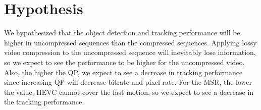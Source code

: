 \section{Hypothesis}
\label{sec:background/section_e}

We hypothesized that the object detection and tracking performance will be higher in uncompressed sequences than the compressed sequences. Applying lossy video compression to the uncompressed sequence will inevitably lose information, so we expect to see the performance to be higher for the uncompressed video. Also, the higher the QP, we expect to see a decrease in tracking performance since increasing QP will decrease bitrate and pixel rate. For the MSR, the lower the value, HEVC cannot cover the fast motion, so we expect to see a decrease in the tracking performance.